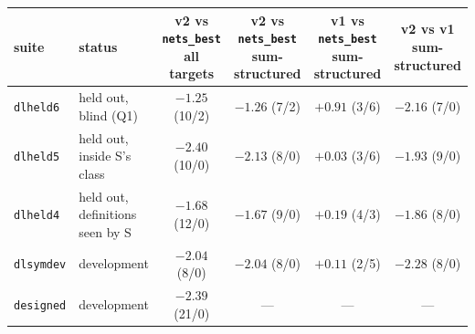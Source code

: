\begin{tabular}{llcccc}
\toprule
suite & status & \hd{v2 vs \texttt{nets\_best}\\all targets} & \hd{v2 vs \texttt{nets\_best}\\sum-structured} & \hd{v1 vs \texttt{nets\_best}\\sum-structured} & \hd{v2 vs v1\\sum-structured}\\
\midrule
\texttt{dlheld6} & held out, blind (Q1) & $-1.25$ (10/2) & $-1.26$ (7/2) & $+0.91$ (3/6) & $-2.16$ (7/0)\\
\texttt{dlheld5} & held out, inside S's class & $-2.40$ (10/0) & $-2.13$ (8/0) & $+0.03$ (3/6) & $-1.93$ (9/0)\\
\texttt{dlheld4} & held out, definitions seen by S & $-1.68$ (12/0) & $-1.67$ (9/0) & $+0.19$ (4/3) & $-1.86$ (8/0)\\
\texttt{dlsymdev} & development & $-2.04$ (8/0) & $-2.04$ (8/0) & $+0.11$ (2/5) & $-2.28$ (8/0)\\
\texttt{designed} & development & $-2.39$ (21/0) & --- & --- & ---\\
\bottomrule
\end{tabular}
